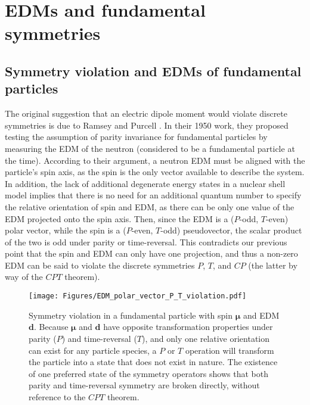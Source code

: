 \documentclass [10pt, twoside] {uwthesis}[2012/04/02]
\begin{document}
\section{EDMs and fundamental symmetries}
\subsection{Symmetry violation and EDMs of fundamental particles}
The original suggestion that an electric dipole moment would violate discrete symmetries is due to Ramsey and Purcell \cite{1950_Purcell_Ramsey_EDM}. In their 1950 work, they proposed testing the assumption of parity invariance for fundamental particles by measuring the EDM of the neutron (considered to be a fundamental particle at the time). According to their argument, a neutron EDM must be aligned with the particle's spin axis, as the spin is the only vector available to describe the system. In addition, the lack of additional degenerate energy states in a nuclear shell model implies that there is no need for an additional quantum number to specify the relative orientation of spin and EDM, as there can be only one value of the EDM projected onto the spin axis. Then, since the EDM is a ($P$-odd, $T$-even) polar vector, while the spin is a ($P$-even, $T$-odd) pseudovector, the scalar product of the two is odd under parity or time-reversal. This contradicts our previous point that the spin and EDM can only have one projection, and thus a non-zero EDM can be said to violate the discrete symmetries $P$, $T$, and $CP$ (the latter by way of the $CPT$ theorem). 
\begin{figure}
\begin{center}
\texttt{[image: Figures/EDM\_polar\_vector\_P\_T\_violation.pdf]}
\end{center}
\caption[Parity and Time-reversal symmetry violation with a polar vector EDM]%
{\narrower Symmetry violation in a fundamental particle with spin $\boldsymbol{\mu}$ and EDM $\mathbf{d}$. Because $\boldsymbol{\mu}$ and $\mathbf{d}$ have opposite transformation properties under parity ($P$) and time-reversal ($T$), and only one relative orientation can exist for any particle species, a $P$ or $T$ operation will transform the particle into a state that does not exist in nature. The existence of one preferred state of the symmetry operators shows that both parity and time-reversal symmetry are broken directly, without reference to the $CPT$ theorem.}
\label{polarvecPTv}
\end{figure}
\end{document}
